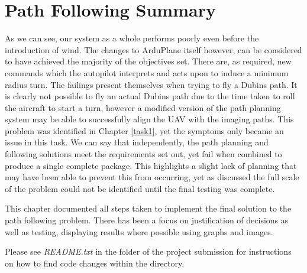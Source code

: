 \section{Path Following Summary}
\label{task2:summary}

As we can see, our system as a whole performs poorly even before the introduction of wind. The changes to ArduPlane itself however, can be considered to have achieved the majority of the objectives set. There are, as required, new commands which the autopilot interprets and acts upon to induce a minimum radius turn. The failings present themselves when trying to fly a Dubins path. It is clearly not possible to fly an actual Dubins path due to the time taken to roll the aircraft to start a turn, however a modified version of the path planning system may be able to successfully align the UAV with the imaging paths. This problem was identified in Chapter \ref{task1}, yet the symptoms only became an issue in this task. We can say that independently, the path planning and following solutions meet the requirements set out, yet fail when combined to produce a single complete package. This highlights a slight lack of planning that may have been able to prevent this from occurring, yet as discussed the full scale of the problem could not be identified until the final testing was complete.

This chapter documented all steps taken to implement the final solution to the path following problem. There has been a focus on justification of decisions as well as testing, displaying results where possible using graphs and images.

Please see \textit{README.txt} in the  folder of the project submission for instructions on how to find code changes within the  directory.

